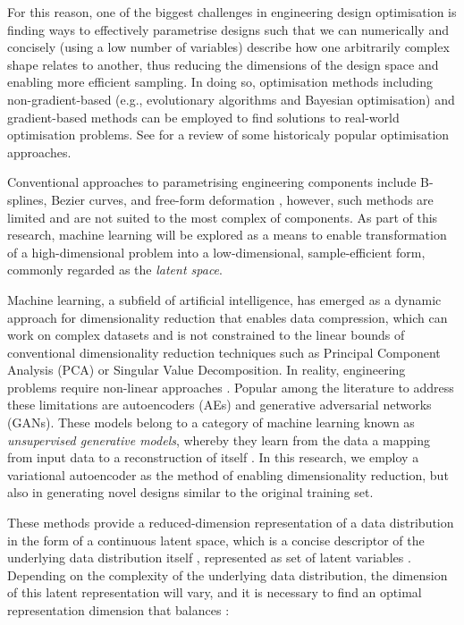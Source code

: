 \documentclass{article}
\begin{document}
For this reason, one of the biggest challenges in engineering design optimisation is finding ways to effectively parametrise designs such that we can numerically and concisely (using a low number of variables) describe how one arbitrarily complex shape relates to another, thus reducing the dimensions of the design space and enabling more efficient sampling. In doing so, optimisation methods including non-gradient-based \citep{Hare2013} (e.g., evolutionary algorithms and Bayesian optimisation) and gradient-based methods can be employed to find solutions to real-world optimisation problems. See \citep{Roy2008} for a review of some historicaly popular optimisation approaches.

 Conventional approaches to parametrising engineering components include B-splines, Bezier curves, and free-form deformation \citep{Jabn2024}, however, such methods are limited and are not suited to the most complex of components. As part of this research, machine learning will be explored as a means to enable transformation of a high-dimensional problem into a low-dimensional, sample-efficient form, commonly regarded as the \textit{latent space}. 

Machine learning, a subfield of artificial intelligence, has emerged as a dynamic approach for dimensionality reduction that enables data compression, which can work on complex datasets and is not constrained to the linear bounds of conventional dimensionality reduction techniques such as Principal Component Analysis (PCA) \citep{Lew2021} or Singular Value Decomposition. In reality, engineering problems require non-linear approaches \citep{Jabn2024}. Popular among the literature to address these limitations are autoencoders (AEs) and generative adversarial networks (GANs). These models belong to a category of machine learning known as \textit{unsupervised generative models}, whereby they learn from the data a mapping from input data to a reconstruction of itself \citep{Lew2021}. In this research, we employ a variational autoencoder as the method of enabling dimensionality reduction, but also in generating novel designs similar to the original training set.

These methods provide a reduced-dimension representation of a data distribution in the form of a continuous latent space, which is a concise descriptor of the underlying data distribution itself \citep{Zheng2023}, represented as set of latent variables \citep{Jabn2024}. Depending on the complexity of the underlying data distribution, the dimension of this latent representation will vary, and it is necessary to find an optimal representation dimension that balances \citep{Lew2021}: 
\end{document}
